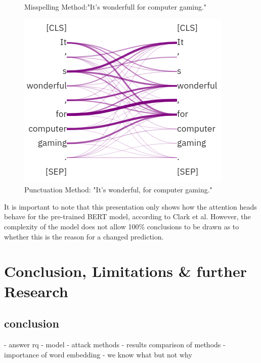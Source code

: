 \begin{figure}[!htb]
  \caption[BERTbase attention heads - Misspelling]{Misspelling Method:"It's wonderfull for computer gaming."}\label{fig:attention_typo}
\endminipage\hfill
{}%
  \includegraphics[width=\linewidth]{img/attention_punct.png}
  \caption[BERTbase attention heads - Punctuation]{Punctuation Method: "It's wonderful, for computer gaming."}\label{fig:attention_punct}
\endminipage
\end{figure}

It is important to note that this presentation only shows how the attention heads behave for the pre-trained BERT model, according to Clark et al. However, the complexity of the model does not allow 100\% conclusions to be drawn as to whether this is the reason for a changed prediction. 





\section{Conclusion, Limitations \& further Research}

\subsection{conclusion}

- answer rq
- model
- attack methods
- results comparison of methods
- importance of word embedding
- we know what but not why



